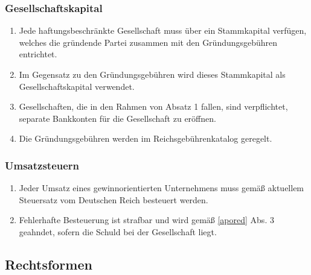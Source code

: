 \documentclass{article}
\begin{document}
\subsubsection{Gesellschaftskapital}
\begin{enumerate}[(1)]
    \item Jede haftungsbeschränkte Gesellschaft muss über ein Stammkapital verfügen, welches die gründende Partei zusammen mit den Gründungsgebühren entrichtet.
    \item Im Gegensatz zu den Gründungsgebühren wird dieses Stammkapital als Gesellschaftskapital verwendet.
    \item Gesellschaften, die in den Rahmen von Absatz 1 fallen, sind verpflichtet, separate Bankkonten für die Gesellschaft zu eröffnen.
    \item Die Gründungsgebühren werden im Reichsgebührenkatalog geregelt.
\end{enumerate}

\subsubsection{Umsatzsteuern}
\begin{enumerate}[(1)]
    \item Jeder Umsatz eines gewinnorientierten Unternehmens muss gemäß aktuellem Steuersatz vom Deutschen Reich besteuert werden.
    \item Fehlerhafte Besteuerung ist strafbar und wird gemäß \ref{apored} Abs. 3 geahndet, sofern die Schuld bei der Gesellschaft liegt.
\end{enumerate}

\subsection{Rechtsformen}
\end{document}
